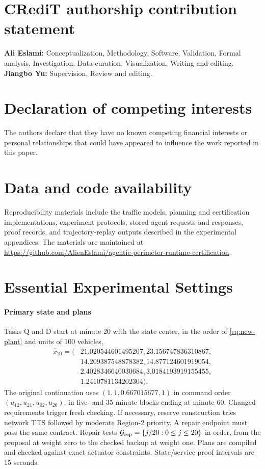 \documentclass[preprint,12pt]{elsarticle}
\begin{document}
\FloatBarrier
\section*{CRediT authorship contribution statement}
\textbf{Ali Eslami:} Conceptualization, Methodology, Software, Validation,
Formal analysis, Investigation, Data curation, Visualization,
Writing and editing.
\textbf{Jiangbo Yu:} Supervision, Review and editing.

\section*{Declaration of competing interests}
The authors declare that they have no known competing financial interests or
personal relationships that could have appeared to influence the work
reported in this paper.

\section*{Data and code availability}
Reproducibility materials include the traffic models, planning and
certification implementations, experiment protocols, stored agent requests
and responses, proof records, and trajectory-replay outputs described in the
experimental appendices. The materials are maintained at
\url{https://github.com/AlienEslami/agentic-perimeter-runtime-certification}.


\appendix
\renewcommand{\theequation}{\Alph{section}.\arabic{equation}}
\section{Essential Experimental Settings}
\label{app:experimental-settings}
\label{app:reusable-benchmark}
\label{sec:supp-queue-settings}
\label{app:benchmark-details}

\paragraph{Primary state and plans}
Tasks Q and D start at minute 20 with the state center, in the order of
\eqref{eq:new-plant} and units of 100 vehicles,
\[
\begin{aligned}
\widehat x_{20}=(&21.020544601495207,23.156747836310867,\\
&14.209387548878382,14.877124601919054,\\
&2.4028346640030684,3.0184193919155455,\\
&1.2410781134202304).
\end{aligned}
\]
The original continuation uses $(1,1,0.667015677,1)$ in command order
$(u_{12},u_{21},u_{02},u_{20})$, in five- and
35-minute blocks ending at minute 60. Changed requirements trigger fresh
checking. If necessary, reserve construction tries network TTS followed
by moderate Region-2 priority. A repair endpoint must pass the same
contract. Repair tests $\mathcal G_{\rm rep}=\{j/20:0\le j\le20\}$ in order,
from the proposal at weight zero to the checked backup at weight one. Plans are
compiled and checked against exact actuator constraints. State/service
proof intervals are 15 seconds.
\end{document}
